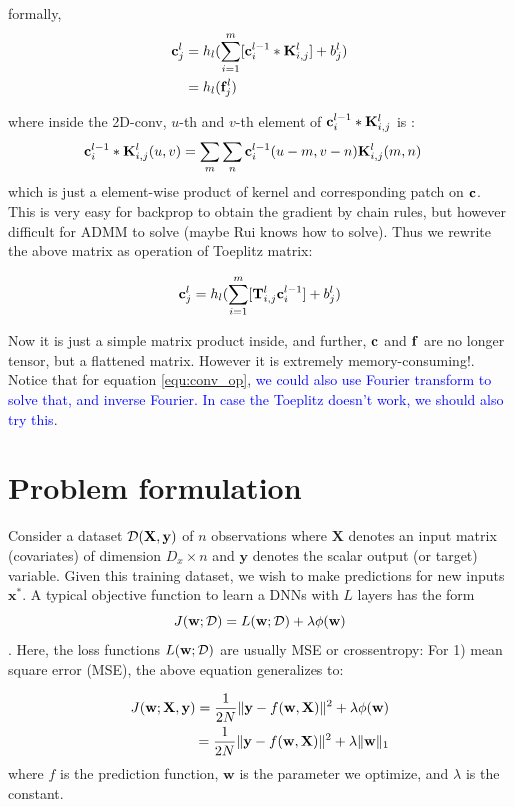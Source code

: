 \documentclass[11pt,a4paper]{article}
\begin{document}
formally, 
\begin{align}
\mathbf{c}^l_j &= h_l(\sum^m_{i=1}[\mathbf{c}^{l-1}_i * \mathbf{K}^l_{i,j}] + b^l_j)\\
&= h_l(\mathbf{f}^l_j)
\label{equ:conv_op}
\end{align}

where inside the 2D-conv, $u$-th and $v$-th element of $\mathbf{c}^{l-1}_i * \mathbf{K}^l_{i,j}$ is :
\begin{align}
\mathbf{c}^{l-1}_i * \mathbf{K}^l_{i,j} (u,v) &= \sum_m\sum_n \mathbf{c}^{l-1}_i (u-m, v-n) \mathbf{K}^l_{i,j} (m,n)
\end{align}
which is just a element-wise product of kernel and corresponding patch on $\mathbf{c}$. This is very easy for backprop to obtain the gradient by chain rules, but however difficult for ADMM to solve (maybe Rui knows how to solve). Thus we rewrite the above matrix as operation of Toeplitz matrix:

\begin{equation}
\mathbf{c}^l_j = h_l(\sum^m_{i=1}[\mathbf{T}^l_{i,j}\mathbf{c}^{l-1}_i ] + b^l_j)
\end{equation}

Now it is just a simple matrix product inside, and further, $\mathbf{c}$ and $\mathbf{f}$ are no longer tensor, but a flattened matrix. However it is extremely memory-consuming!. Notice that for equation \eqref{equ:conv_op}, \textcolor{blue}{we could also use Fourier transform to solve that, and inverse Fourier. In case the Toeplitz doesn't work, we should also try this}. 
\section{Problem formulation}
Consider a dataset $\mathcal{D}(\mathbf{X}, \mathbf{y})$ of $n$ observations where $\mathbf{X}$ denotes an input matrix (covariates) of dimension $D_x \times n$ and $\mathbf{y}$ denotes the scalar output (or target) variable.  Given this training dataset,  we wish to make predictions for new inputs $\mathbf{x}^*$. A typical objective function to learn a DNNs with $L$ layers has the
form 
\begin{equation}
J(\mathbf{w}; \mathcal{D}) = L(\mathbf{w}; \mathcal{D}) + \lambda \phi (\mathbf{w})
\end{equation}. 
Here, the loss functions $L(\mathbf{w}; \mathcal{D})$ are usually MSE or crossentropy:
For 1) mean square error (MSE), the above equation generalizes to:

\begin{equation}
\begin{split}
\label{eq:objective_mse}
J(\mathbf{w}; \mathbf{X}, \mathbf{y}) = \frac{1}{2N}\lVert\mathbf{y} - f(\mathbf{w}, \mathbf{X})\rVert^2 + \lambda \phi(\mathbf{w}) \\
= \frac{1}{2N}\lVert\mathbf{y} - f(\mathbf{w}, \mathbf{X})\rVert^2 + \lambda \| \mathbf{w} \|_1
\end{split}
\end{equation}
where $f$ is the prediction function, $\mathbf{w}$ is the parameter we optimize,  and $\lambda$ is the constant. 
\end{document}

